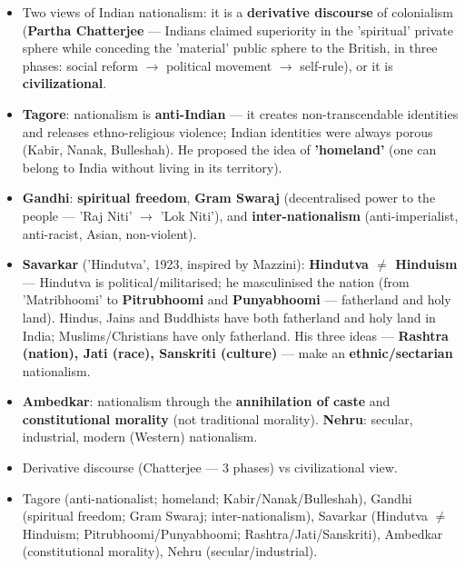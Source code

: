 \begin{KeyConcept}
\begin{itemize}
\item Two views of Indian nationalism: it is a \textbf{derivative discourse} of colonialism (\textbf{Partha Chatterjee} --- Indians claimed superiority in the 'spiritual' private sphere while conceding the 'material' public sphere to the British, in three phases: social reform $\rightarrow$ political movement $\rightarrow$ self-rule), or it is \textbf{civilizational}.
\item \textbf{Tagore}: nationalism is \textbf{anti-Indian} --- it creates non-transcendable identities and releases ethno-religious violence; Indian identities were always porous (Kabir, Nanak, Bulleshah). He proposed the idea of \textbf{'homeland'} (one can belong to India without living in its territory).
\item \textbf{Gandhi}: \textbf{spiritual freedom}, \textbf{Gram Swaraj} (decentralised power to the people --- 'Raj Niti' $\rightarrow$ 'Lok Niti'), and \textbf{inter-nationalism} (anti-imperialist, anti-racist, Asian, non-violent).
\item \textbf{Savarkar} ('Hindutva', 1923, inspired by Mazzini): \textbf{Hindutva $\neq$ Hinduism} --- Hindutva is political/militarised; he masculinised the nation (from 'Matribhoomi' to \textbf{Pitrubhoomi} and \textbf{Punyabhoomi} --- fatherland and holy land). Hindus, Jains and Buddhists have both fatherland and holy land in India; Muslims/Christians have only fatherland. His three ideas --- \textbf{Rashtra (nation), Jati (race), Sanskriti (culture)} --- make an \textbf{ethnic/sectarian} nationalism.
\item \textbf{Ambedkar}: nationalism through the \textbf{annihilation of caste} and \textbf{constitutional morality} (not traditional morality). \textbf{Nehru}: secular, industrial, modern (Western) nationalism.
\end{itemize}
\end{KeyConcept}

\begin{QuickRevision}
\begin{itemize}
\item Derivative discourse (Chatterjee --- 3 phases) vs civilizational view.
\item Tagore (anti-nationalist; homeland; Kabir/Nanak/Bulleshah), Gandhi (spiritual freedom; Gram Swaraj; inter-nationalism), Savarkar (Hindutva $\neq$ Hinduism; Pitrubhoomi/Punyabhoomi; Rashtra/Jati/Sanskriti), Ambedkar (constitutional morality), Nehru (secular/industrial).
\end{itemize}
\end{QuickRevision}

